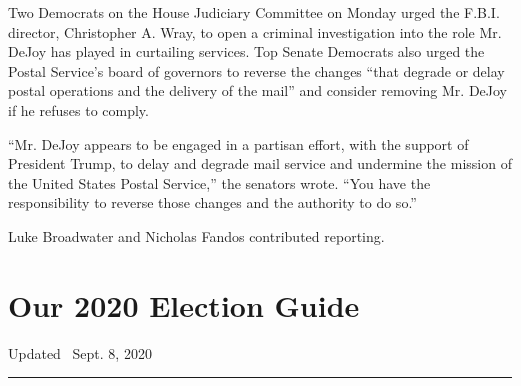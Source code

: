 Two Democrats on the House Judiciary Committee on Monday urged the
F.B.I. director, Christopher A. Wray, to open a criminal investigation
into the role Mr. DeJoy has played in curtailing services. Top Senate
Democrats also urged the Postal Service's board of governors to reverse
the changes ``that degrade or delay postal operations and the delivery
of the mail'' and consider removing Mr. DeJoy if he refuses to comply.

``Mr. DeJoy appears to be engaged in a partisan effort, with the support
of President Trump, to delay and degrade mail service and undermine the
mission of the United States Postal Service,'' the senators wrote. ``You
have the responsibility to reverse those changes and the authority to do
so.''

Luke Broadwater and Nicholas Fandos contributed reporting.

\hypertarget{our-2020-election-guide}{%
\section{Our 2020 Election Guide}\label{our-2020-election-guide}}

Updated ~Sept. 8, 2020

\begin{center}\rule{0.5\linewidth}{\linethickness}\end{center}

